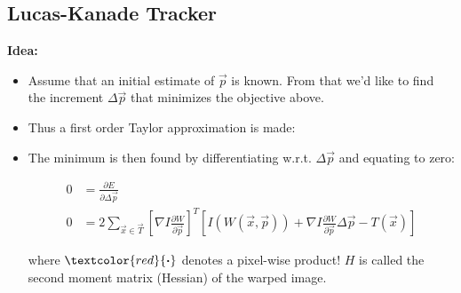 \documentclass[10pt,a4paper]{scrartcl}
\begin{document}
\begin{multicols*}{2}
\subsection{Lucas-Kanade Tracker}


\textbf{Idea:}
\begin{itemize}
\item Assume that an initial estimate of $\vec{p}$ is known. From that we'd like to find the increment $\Delta\vec{p}$ that minimizes the objective above.
\item Thus a first order Taylor approximation is made:


\item The minimum is then found by differentiating w.r.t. $\Delta\vec{p}$ and equating to zero:

\begin{align*}
0&=\frac{\partial E}{\partial\Delta\vec{p}}\\
0&=2\sum\limits_{\vec{x}\in\vec{T}}\left[\nabla I\frac{\partial W}{\partial\vec{p}}\right]^T\left[I(W(\vec{x},\vec{p}))+\nabla I\frac{\partial W}{\partial \vec{p}}\Delta \vec{p}-T(\vec{x})\right]
\end{align*}


where $\textcolor{red}{\boldsymbol{\cdot}}$ denotes a pixel-wise product! $H$ is called the second moment matrix (Hessian) of the warped image.
\end{itemize}


\end{multicols*}
\end{document}
